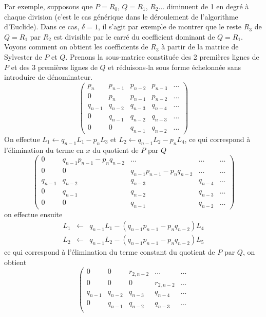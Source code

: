 \documentclass[a4paper,11pt]{book}
\begin{document}
\begin{giacjshere}
Par exemple, supposons que $P=R_0$, $Q=R_1$, $R_2$... diminuent de 1 en degr\'e
\`a chaque division 
(c'est le cas g\'en\'erique dans le d\'eroulement de l'algorithme
d'Euclide). Dans ce cas, $\delta=1$, il s'agit par exemple
de montrer que le reste $R_3$ de $Q=R_1$ par $R_2$ est divisible par le
carr\'e du coefficient dominant de $Q=R_1$.
Voyons comment on obtient les coefficients de $R_3$
\`a partir de la matrice de Sylvester de $P$ et $Q$. 
Prenons la sous-matrice constitu\'ee des 2 premi\`eres lignes de $P$
et des 3 premi\`eres lignes de $Q$ et r\'eduisons-la sous forme
\'echelonn\'ee sans introduire de d\'enominateur. 
\[
\left( \begin{array}{ccccc}
p_n & p_{n-1} & p_{n-2} & p_{n-3} & ... \\
0 & p_n & p_{n-1} & p_{n-2} &  ... \\
q_{n-1} & q_{n-2} & q_{n-3} & q_{n-4} & ... \\
0 & q_{n-1} & q_{n-2} & q_{n-3} & ... \\
0 & 0 & q_{n-1} & q_{n-2} &  ...  
\end{array} 
\right)
\]
On effectue $L_1 \leftarrow q_{n-1} L_1 - p_n L_3$
et $L_2 \leftarrow q_{n-1} L_2 - p_n L_4$, ce qui correspond \`a
l'\'elimination du terme en $x$ du quotient de $P$ par $Q$
\[
\left( \begin{array}{ccccc}
0 & q_{n-1} p_{n-1} - p_n q_{n-2}  & ... & ... & ... \\
0 & 0 & q_{n-1} p_{n-1} - p_n q_{n-2} & ... &  ... \\
q_{n-1} & q_{n-2} & q_{n-3} & q_{n-4} & ... \\
0 & q_{n-1} & q_{n-2} & q_{n-3} & ... \\
0 & 0 & q_{n-1} & q_{n-2} &  ...  
\end{array} 
\right)
\]
on effectue ensuite 
\begin{eqnarray*}
L_1 & \leftarrow &q_{n-1} L_1 - (q_{n-1} p_{n-1} - p_n q_{n-2})  L_4 \\
L_2 & \leftarrow & q_{n-1} L_2 - (q_{n-1} p_{n-1} - p_n q_{n-2})  L_5
\end{eqnarray*} 
ce qui correspond \`a l'\'elimination du terme constant du quotient
de $P$ par $Q$, on obtient
\[
\left( \begin{array}{ccccc}
0 & 0 & r_{2,n-2} & ... & ... \\
0 & 0 & 0 & r_{2,n-2} &  ... \\
q_{n-1} & q_{n-2} & q_{n-3} & q_{n-4} & ... \\
0 & q_{n-1} & q_{n-2} & q_{n-3} & ... \\

\end{array}\]
\end{giacjshere}
\end{document}
